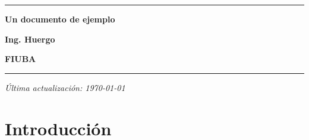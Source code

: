 \documentclass{article}
\begin{document}
\begin{titlepage}
  \centering

  \vfill %

  \rule{\textwidth}{1pt} %

  \vspace{0.5cm} %

  \textbf{\Huge Un documento de ejemplo} %

  \bigskip %

  \textbf{\Large Ing. Huergo} %

  \medskip %

  \textbf{\large FIUBA} %

  \rule{\textwidth}{1pt} %

  \vspace{0.5cm} %

  \vfill %


  \textit{Última actualización: \today}

\end{titlepage}

\section*{Introducción}
\end{document}
